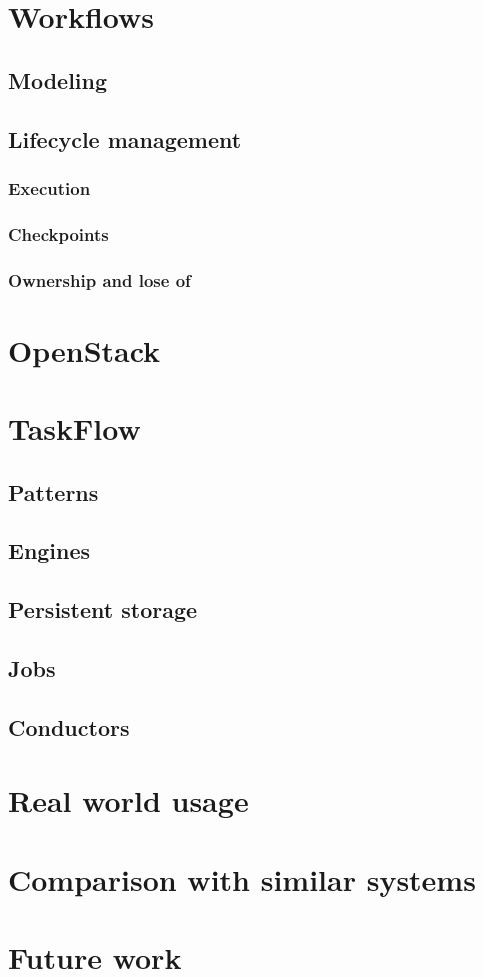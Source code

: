 \documentclass[11pt,a4paper]{article}
\begin{document}
\section{Workflows}

\subsection{Modeling}

\subsection{Lifecycle management}

\subsubsection{Execution}

\subsubsection{Checkpoints}

\subsubsection{Ownership and lose of}

\section{OpenStack}

\section{TaskFlow}

\subsection{Patterns}

\subsection{Engines}

\subsection{Persistent storage}

\subsection{Jobs}

\subsection{Conductors}

\section{Real world usage}

\section{Comparison with similar systems}

\section{Future work}
\end{document}
